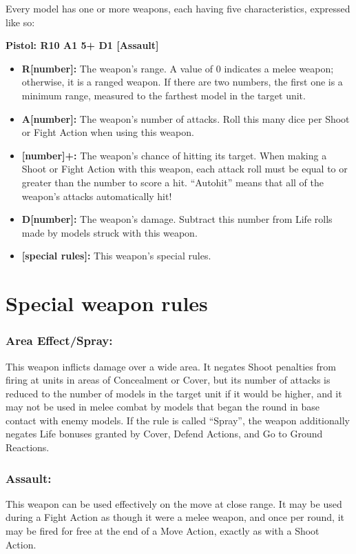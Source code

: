 \begin{multicols}{2}
Every model has one or more weapons, each having five characteristics, expressed like so:

\textbf{Pistol: R10 A1 5+ D1 [Assault]}

\begin{itemize}
    \item \textbf{R[number]:} The weapon's range. A value of 0 indicates a melee weapon; otherwise, it is a ranged weapon. If there are two numbers, the first one is a minimum range, measured to the farthest model in the target unit.
    \item \textbf{A[number]:} The weapon's number of attacks. Roll this many dice per Shoot or Fight Action when using this weapon.
    \item \textbf{[number]+:} The weapon's chance of hitting its target. When making a Shoot or Fight Action with this weapon, each attack roll must be equal to or greater than the number to score a hit. ``Autohit'' means that all of the weapon's attacks automatically hit!
    \item \textbf{D[number]:} The weapon's damage. Subtract this number from Life rolls made by models struck with this weapon.
    \item \textbf{[special rules]:} This weapon's special rules.
\end{itemize}




\section*{Special weapon rules}

\subsubsection*{Area Effect/Spray:} This weapon inflicts damage over a wide area. It negates Shoot penalties from firing at units in areas of Concealment or Cover, but its number of attacks is reduced to the number of models in the target unit if it would be higher, and it may not be used in melee combat by models that began the round in base contact with enemy models. If the rule is called ``Spray'', the weapon additionally negates Life bonuses granted by Cover, Defend Actions, and Go to Ground Reactions.

\subsubsection*{Assault:} This weapon can be used effectively on the move at close range. It may be used during a Fight Action as though it were a melee weapon, and once per round, it may be fired for free at the end of a Move Action, exactly as with a Shoot Action.


\end{multicols}
